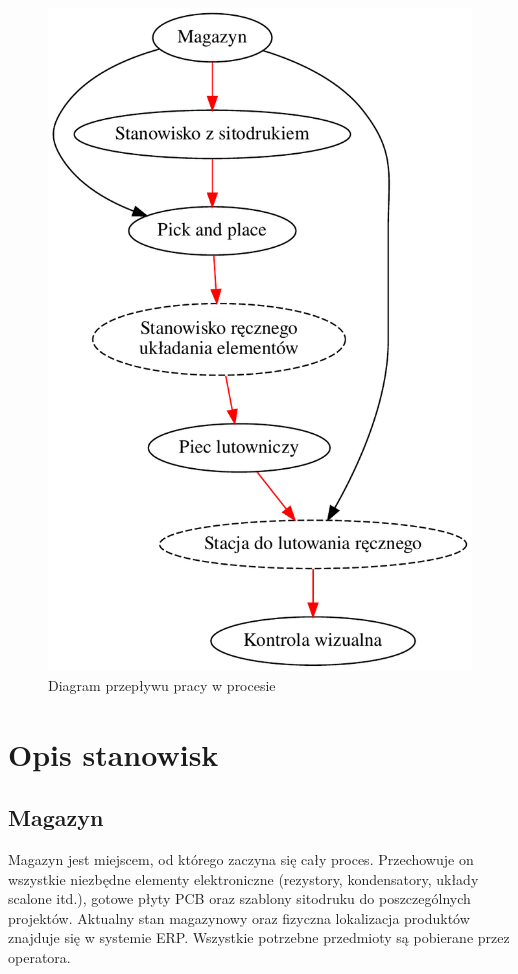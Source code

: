 \begin{figure}[H]
	\centering
	\includegraphics[scale=0.5]{./chapters/chapter2/flow_work.pdf}
	\caption{Diagram przepływu pracy w procesie}
	\label{DiagFlow}
\end{figure}

\section{Opis stanowisk}

\subsection{Magazyn}
Magazyn jest miejscem, od którego zaczyna się cały proces.
Przechowuje on wszystkie niezbędne elementy elektroniczne (rezystory, kondensatory, układy scalone itd.), gotowe płyty PCB oraz szablony sitodruku do poszczególnych projektów.
Aktualny stan magazynowy oraz fizyczna lokalizacja produktów znajduje się w systemie ERP\@.
Wszystkie potrzebne przedmioty są pobierane przez operatora.

